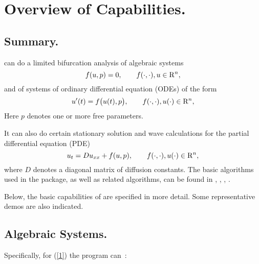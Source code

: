 \chapter{ Overview of Capabilities.} \label{ch:Overview}
\section{ Summary.} \label{sec:Summary}
\AUTO can do a limited bifurcation analysis of algebraic systems
\begin{equation} \label{1} 
  f( u , p ) = 0 ,  \qquad  f(\cdot,\cdot) , u \in {\rm R}^n,
\end{equation}
and of systems of ordinary differential equation (ODEs) of the form
\begin{equation} \label{2} 
 u'(t) = f\bigl( u(t) , p \bigr) , 
  \qquad  f(\cdot,\cdot) , u(\cdot) \in {\rm R}^n,
\end{equation}
Here $p$ denotes one or more free parameters.

It can also do certain stationary solution and wave calculations for the 
partial differential equation (PDE)
\begin{equation} \label{3} 
  u_t = D u_{xx} + f( u , p ), 
  \qquad  f(\cdot,\cdot) , u(\cdot) \in {\rm R}^n,
\end{equation}
where $D$ denotes a diagonal matrix of diffusion constants.
The basic algorithms used in the package,
as well as related algorithms, can be found in 
 \citeyear{HBK:77},
 \citeyear{HBK:86},
 \citeyear{DoKeKe:91a},
 \citeyear{DoKeKe:91b}.

Below, the basic capabilities of \AUTO are specified in more detail.
Some representative demos are also indicated.
 
\section{ Algebraic Systems.} \label{sec:algebraic_systems}
Specifically, for (\ref{1}) the program can~:~
 
